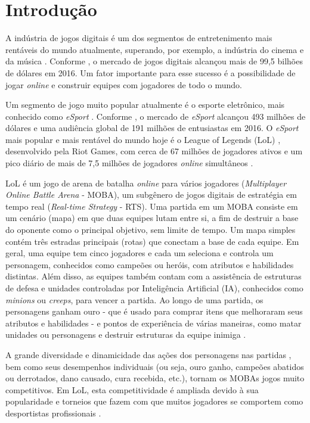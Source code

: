 \chapter{Introdu\c{c}\~{a}o}

A indústria de jogos digitais é um dos segmentos de entretenimento mais rentáveis do mundo atualmente, superando, por exemplo, a indústria do cinema e da música \cite{newzoo1} \cite{ifpi1} \cite{mpaa1}. Conforme \cite{newzoo1}, o mercado de jogos digitais alcançou mais de 99,5 bilhões de dólares em 2016. Um fator importante para esse sucesso é a possibilidade de jogar \textit{online} e construir equipes com jogadores de todo o mundo.

Um segmento de jogo muito popular atualmente é o esporte eletrônico, mais conhecido como \textit{eSport} \cite{forbes1}. Conforme \cite{newzoo2}, o mercado de \textit{eSport} alcançou 493 milhões de dólares e uma audiência global de 191 milhões de entusiastas em 2016. O \textit{eSport} mais popular e mais rentável do mundo hoje é o League of Legends (LoL)  \cite{superdata1}, desenvolvido pela Riot Games, com cerca de 67 milhões de jogadores ativos e um pico diário de mais de 7,5 milhões de jogadores \textit{online} simultâneos \cite{riot1}.

LoL é um jogo de arena de batalha \textit{online} para vários jogadores (\textit{Multiplayer Online Battle Arena} - MOBA), um subgênero de jogos digitais de estratégia em tempo real (\textit{Real-time Strategy} - RTS). Uma partida em um MOBA consiste em um cenário (mapa) em que duas equipes lutam entre si, a fim de destruir a base do oponente como o principal objetivo, sem limite de tempo. Um mapa simples contém três estradas principais (rotas) que conectam a base de cada equipe. Em geral, uma equipe tem cinco jogadores e cada um seleciona e controla um personagem, conhecidos como campeões ou heróis, com atributos e habilidades distintas. Além disso, as equipes também contam com a assistência de estruturas de defesa e unidades controladas por Inteligência Artificial (IA), conhecidos como \textit{minions} ou \textit{creeps}, para vencer a partida. Ao longo de uma partida, os personagens ganham ouro - que é usado para comprar itens que melhoraram seus atributos e habilidades - e pontos de experiência de várias maneiras, como matar unidades ou personagens e destruir estruturas da equipe inimiga \cite{league1}.

A grande diversidade e dinamicidade das ações dos personagens nas partidas \cite{drachen2014skill}, bem como seus desempenhos individuais (ou seja, ouro ganho, campeões abatidos ou derrotados, dano causado, cura recebida, etc.), tornam os MOBAs jogos muito competitivos. Em LoL, esta competitividade é ampliada devido à sua popularidade e torneios que fazem com que muitos jogadores se comportem como desportistas profissionais \cite{rioult2014mining}.

